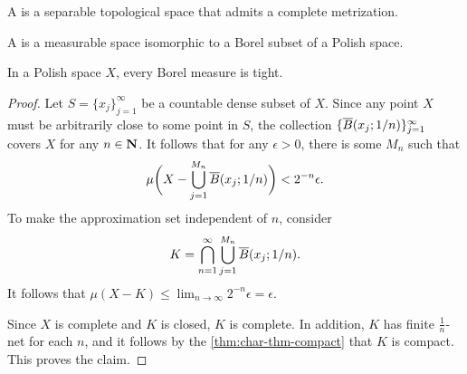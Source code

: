 \begin{defn}
    A  is a separable topological space that admits a complete metrization.
    
    A  is a measurable space isomorphic to a Borel subset of a Polish space.
\end{defn}


\begin{namedthm}
    In a Polish space $X$, every Borel measure is tight.
\end{namedthm}
\begin{proof}
    Let $S = \{x_j\}_{j=1}^\infty$ be a countable dense subset of $X$. Since any point $X$ must be arbitrarily close to some point in $S$, the collection $\{\overline{B}(x_j;1/n)\}_{j=1}^\infty$ covers $X$ for any $n\in \mathbf{N}$. It follows that for any $\epsilon > 0$, there is some $M_n$ such that \[
        \mu\biggl(X - \bigcup_{j=1}^{M_n}\overline{B}(x_j ; 1/n)\biggr) <  2^{-n} \epsilon.
    \] To make the approximation set independent of $n$, consider \[
        K = \bigcap_{n=1}^\infty \bigcup_{j=1}^{M_n}\overline{B}(x_j ; 1/n).
    \] It follows that $\mu(X - K) \leq \lim_{n\to \infty } 2^{-n} \epsilon = \epsilon$.

    Since $X$ is complete and $K$ is closed, $K$ is complete. In addition, $K$ has finite $\frac{1}{n}$-net for each $n$, and it follows by the \cref{thm:char-thm-compact} that $K$ is compact. This proves the claim.
\end{proof}